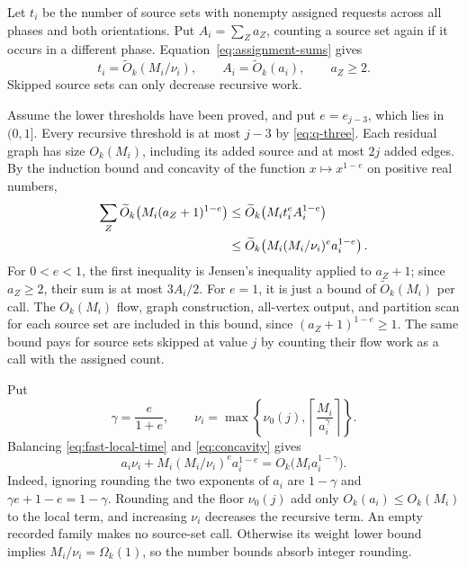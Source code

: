 \documentclass[11pt]{article}
\theoremstyle{definition}
\theoremstyle{remark}
\newcommand{\OO}{\widetilde O}
\begin{document}
Let \(t_i\) be the number of source sets with nonempty assigned requests across all phases and both orientations. Put \(A_i=\sum_Z a_Z\), counting a source set again if it occurs in a different phase. Equation~\eqref{eq:assignment-sums} gives
\begin{equation}
 t_i=\OO_k(M_i/\nu_i),\qquad A_i=\OO_k(a_i),\qquad a_Z\ge2.
 \label{eq:fast-counts}
\end{equation}
Skipped source sets can only decrease recursive work.

Assume the lower thresholds have been proved, and put \(e=e_{j-3}\), which lies in \((0,1]\). Every recursive threshold is at most \(j-3\) by \eqref{eq:q-three}. Each residual graph has size \(O_k(M_i)\), including its added source and at most \(2j\) added edges. By the induction bound and concavity of the function \(x\mapsto x^{1-e}\) on positive real numbers,
\begin{align}
 \sum_Z \OO_k\bigl(M_i(a_Z+1)^{1-e}\bigr)
 &\le\OO_k\bigl(M_i t_i^e A_i^{1-e}\bigr)\notag\\
 &\le\OO_k\!\left(M_i(M_i/\nu_i)^e a_i^{1-e}\right).
 \label{eq:concavity}
\end{align}
For \(0<e<1\), the first inequality is Jensen's inequality applied to \(a_Z+1\); since \(a_Z\ge2\), their sum is at most \(3A_i/2\). For \(e=1\), it is just a bound of \(\OO_k(M_i)\) per call. The \(O_k(M_i)\) flow, graph construction, all-vertex output, and partition scan for each source set are included in this bound, since \((a_Z+1)^{1-e}\ge1\). The same bound pays for source sets skipped at value \(j\) by counting their flow work as a call with the assigned count.

Put
\begin{equation}
 \gamma=\frac{e}{1+e},\qquad
 \nu_i=\max\left\{\nu_0(j),\left\lceil\frac{M_i}{a_i^\gamma}\right\rceil\right\}.
 \label{eq:fast-cap}
\end{equation}
Balancing \eqref{eq:fast-local-time} and \eqref{eq:concavity} gives
\begin{equation}
 a_i\nu_i+M_i(M_i/\nu_i)^e a_i^{1-e}
 =O_k\bigl(M_i a_i^{1-\gamma}\bigr).
 \label{eq:fast-balanced}
\end{equation}
Indeed, ignoring rounding the two exponents of \(a_i\) are
\(1-\gamma\) and \(\gamma e+1-e=1-\gamma\). Rounding and the floor \(\nu_0(j)\) add only \(O_k(a_i)\le O_k(M_i)\) to the local term, and increasing \(\nu_i\) decreases the recursive term. An empty recorded family makes no source-set call. Otherwise its weight lower bound implies \(M_i/\nu_i=\Omega_k(1)\), so the number bounds absorb integer rounding.
\end{document}
